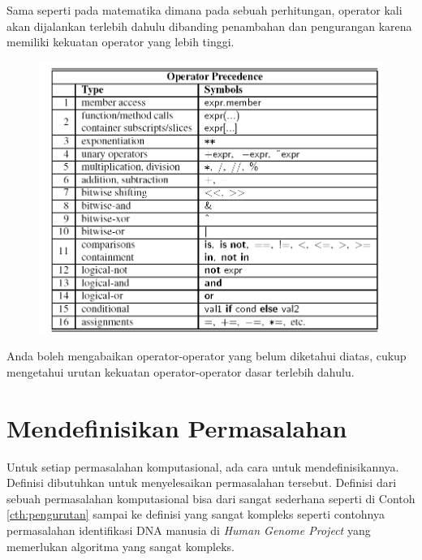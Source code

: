  Sama seperti pada matematika dimana pada sebuah perhitungan, operator kali akan dijalankan terlebih dahulu dibanding penambahan dan pengurangan karena memiliki kekuatan operator yang lebih tinggi. 
	\begin{figure}[h!]
	\centering
	\includegraphics[scale=0.5]{fig/1/Gambar21.png}	
	\end{figure}	
Anda boleh mengabaikan operator-operator yang belum diketahui diatas, cukup mengetahui urutan kekuatan operator-operator dasar terlebih dahulu.	

\newpage
\section{Mendefinisikan Permasalahan}
Untuk setiap permasalahan komputasional, ada cara untuk mendefinisikannya. Definisi dibutuhkan untuk menyelesaikan permasalahan tersebut. Definisi dari sebuah permasalahan komputasional bisa dari sangat sederhana seperti di Contoh \ref{cth:pengurutan} sampai ke definisi yang sangat kompleks seperti contohnya permasalahan identifikasi DNA manusia di \textit{Human Genome Project} yang memerlukan algoritma yang sangat kompleks.


